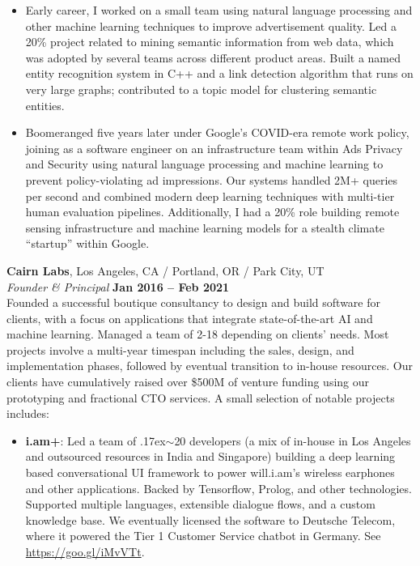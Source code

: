 \documentclass[margin,line]{resume}
\begin{document}
\begin{resume}
    \begin{itemize}
    \item Early career, I worked on a small team using natural language
      processing and other machine learning techniques to improve advertisement
      quality. Led a 20\% project related to mining semantic information from
      web data, which was adopted by several teams across different product
      areas. Built a named entity recognition system in C++ and a link detection
      algorithm that runs on very large graphs; contributed to a topic model for
      clustering semantic entities.

    \item Boomeranged five years later under Google's COVID-era remote work
      policy, joining as a software engineer on an infrastructure team within
      Ads Privacy and Security using natural language processing and machine
      learning to prevent policy-violating ad impressions. Our systems handled
      2M+ queries per second and combined modern deep learning techniques with
      multi-tier human evaluation pipelines. Additionally, I had a 20\% role
      building remote sensing infrastructure and machine learning models for a
      stealth climate ``startup'' within Google.

    \end{itemize}

    \textbf{Cairn Labs}, Los Angeles, CA / Portland, OR / Park City, UT \vspace{2mm}\\\vspace{1mm}%
    \textsl{Founder \& Principal} \hfill \textbf{Jan 2016 -- Feb 2021}\\
    Founded a successful boutique consultancy to design and build software
    for clients, with a focus on applications that integrate state-of-the-art
    AI and machine learning. Managed a team of 2-18 depending on clients' needs.
    Most projects involve a multi-year timespan including the sales, design, and
    implementation phases, followed by eventual transition to in-house
    resources. Our clients have cumulatively raised over \$500M of venture
    funding using our prototyping and fractional CTO services. A small selection
    of notable projects includes:

    \begin{itemize}

    \item \textbf{i.am+}: Led a team of {\raise.17ex\hbox{$\scriptstyle\sim$}}20
      developers (a mix of in-house in Los Angeles and outsourced resources in
      India and Singapore) building a deep learning based conversational UI
      framework to power will.i.am's wireless earphones and other applications.
      Backed by Tensorflow, Prolog, and other technologies. Supported multiple
      languages, extensible dialogue flows, and a custom knowledge base. We
      eventually licensed the software to Deutsche Telecom, where it powered the
      Tier 1 Customer Service chatbot in Germany. See \url{https://goo.gl/iMvVTt}.


\end{itemize}
\end{resume}
\end{document}
